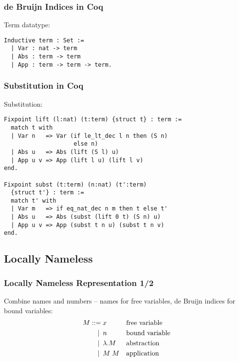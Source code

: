 \documentclass[notheorems]{beamer}
\begin{document}
\begin{frame}[fragile]

  \frametitle{de Bruijn Indices in Coq}

  Term datatype:
  \begin{lstlisting}
Inductive term : Set :=
  | Var : nat -> term
  | Abs : term -> term
  | App : term -> term -> term.
  \end{lstlisting}

\end{frame}


\begin{frame}[fragile]

  \frametitle{Substitution in Coq}

  Substitution:
  \begin{lstlisting}
Fixpoint lift (l:nat) (t:term) {struct t} : term :=
  match t with
  | Var n   => Var (if le_lt_dec l n then (S n)
                    else n)
  | Abs u   => Abs (lift (S l) u)
  | App u v => App (lift l u) (lift l v)
end.

Fixpoint subst (t:term) (n:nat) (t':term)
  {struct t'} : term :=
  match t' with
  | Var m   => if eq_nat_dec n m then t else t'
  | Abs u   => Abs (subst (lift 0 t) (S n) u)
  | App u v => App (subst t n u) (subst t n v)
end.
  \end{lstlisting}

\end{frame}


\subsection{Locally Nameless}




\begin{frame}

  \frametitle{Locally Nameless Representation 1/2}

  Combine names and numbers -- names for free variables, de Bruijn indices for bound variables:
  \begin{align*}
    M ::=             &\; x
    && \text{free variable} \\
    \llap{\textbar\:} &\; n
    && \text{bound variable} \\
    \llap{\textbar\:} &\; \lambda .M
    && \text{abstraction} \\
    \llap{\textbar\:} &\; M \; M
    && \text{application} \\
  \end{align*}


\end{frame}
\end{document}
